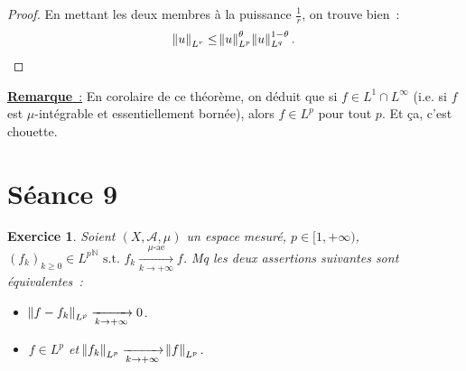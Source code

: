 \documentclass{article}
\newtheorem{ex}{Exercice}[section]
\newcommand{\pinfty}{{+\infty}}
\newcommand{\st}{\text{ s.t. }}
\newcommand{\N}{{\mathbb N}}
\begin{document}
\begin{proof}
En mettant les deux membres à la puissance $\frac 1r$, on trouve bien~:
\[\norm u_{L^r} \leq \norm u_{L^p}^\theta\norm u_{L^q}^{1-\theta}.\]

\end{proof}

\underline {\textbf {Remarque}~:} En corolaire de ce théorème, on déduit que si $f \in L^1 \cap L^\infty$ (i.e. si $f$ est $\mu$-intégrable et essentiellement bornée), alors
$f \in L^p$ pour tout $p$. Et ça, c'est chouette.

\newpage
\section{Séance 9}

\begin{ex} Soient $(X, \mathcal A, \mu)$ un espace mesuré, $p \in [1, \pinfty)$, $(f_k)_{k \geq 0} \in {L^p}^\N \st f_k \xrightarrow[k \to \pinfty]{\mu\text{-ae}} f$. Mq
les deux assertions suivantes sont équivalentes~:
\begin{itemize}
	\item[a)] $\norm {f-f_k}_{L^p} \xrightarrow[k \to \pinfty]{} 0$.
	\item[b)] $f \in L^p$ et $\norm {f_k}_{L^p} \xrightarrow[k \to \pinfty]{} \norm f_{L^p}$.
\end{itemize}
\end{ex}
\end{document}
